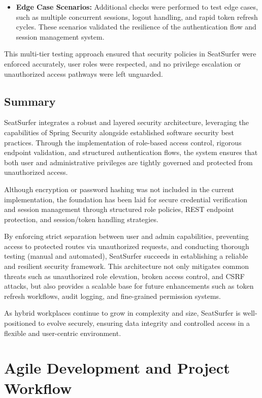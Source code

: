 \documentclass[12pt,a4paper]{report}
\begin{document}
\begin{itemize}
\item \textbf{Edge Case Scenarios:}  
Additional checks were performed to test edge cases, such as multiple concurrent sessions, logout handling, and rapid token refresh cycles. These scenarios validated the resilience of the authentication flow and session management system.
\end{itemize}

This multi-tier testing approach ensured that security policies in SeatSurfer were enforced accurately, user roles were respected, and no privilege escalation or unauthorized access pathways were left unguarded.

\section{Summary}

SeatSurfer integrates a robust and layered security architecture, leveraging the capabilities of Spring Security alongside established software security best practices. Through the implementation of role-based access control, rigorous endpoint validation, and structured authentication flows, the system ensures that both user and administrative privileges are tightly governed and protected from unauthorized access.

Although encryption or password hashing was not included in the current implementation, the foundation has been laid for secure credential verification and session management through structured role policies, REST endpoint protection, and session/token handling strategies.

By enforcing strict separation between user and admin capabilities, preventing access to protected routes via unauthorized requests, and conducting thorough testing (manual and automated), SeatSurfer succeeds in establishing a reliable and resilient security framework. This architecture not only mitigates common threats such as unauthorized role elevation, broken access control, and CSRF attacks, but also provides a scalable base for future enhancements such as token refresh workflows, audit logging, and fine-grained permission systems.

As hybrid workplaces continue to grow in complexity and size, SeatSurfer is well-positioned to evolve securely, ensuring data integrity and controlled access in a flexible and user-centric environment.

\newpage

\chapter{Agile Development and Project Workflow}
\end{document}
